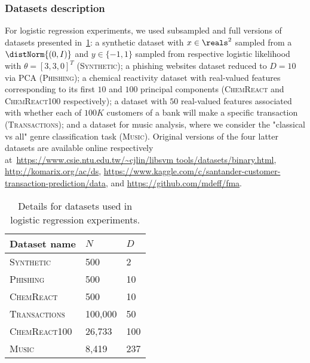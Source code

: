 \subsubsection{Datasets description}
\label{supp:logreg_data_details}
For logistic regression experiments, we used subsampled and full versions of datasets presented in~\cref{table:datasets_details}: a synthetic dataset with $ x\in \reals^2 $ sampled \iid from a $\distNorm{(0, I)}$ and $ y\in\{-1,1\} $ sampled from respective logistic likelihood with $ \theta =[3, 3, 0]^T$ (\textsc{Synthetic}); a phishing websites dataset reduced to $ D=10 $ via PCA (\textsc{Phishing}); a chemical reactivity dataset with  real-valued features corresponding to its first $ 10 $ and $ 100 $ principal components (\textsc{ChemReact} and \textsc{ChemReact100} respectively); a dataset with $ 50 $ real-valued features associated with whether each of $ 100K $ customers of a bank will make a specific transaction (\textsc{Transactions}); and a dataset for music analysis, where we consider the "classical vs all" genre classification task (\textsc{Music}). Original versions of the four latter datasets are available online respectively at~\href{https://www.csie.ntu.edu.tw/~cjlin/libsvmtools/datasets/binary.html}{https://www.csie.ntu.edu.tw/\~{}cjlin/libsvm tools/datasets/binary.html},  \href{http://komarix.org/ac/ds/}{http://komarix.org/ac/ds},  \href{https://www.kaggle.com/c/santander-customer-transaction-prediction/data}{https://www.kaggle.com/c/santander-customer- transaction-prediction/data}, and \href{https://github.com/mdeff/fma}{https://github.com/mdeff/fma}. 

\begin{table}[!h]
	\begin{center}
		\begin{tabular}{|l|l|l|}
			\hline
			\textbf{Dataset name}       & $N$      & $D$   \\ \hline
			\textsc{Synthetic}  & 500    & 2   \\ \hline
			\textsc{Phishing}   & 500    & 10  \\ \hline
			\textsc{ChemReact}        & 500    & 10  \\ \hline
			\textsc{Transactions}  & 100,000   & 50   \\ \hline
			\textsc{ChemReact100}    & 26,733 & 100 \\ \hline
		    \textsc{Music}      & 8,419    & 237 \\ \hline
		\end{tabular}
	\end{center}
	\caption{Details for datasets used in logistic regression experiments.}
	\label{table:datasets_details}
\end{table}

